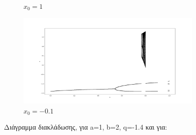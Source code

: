 \begin{figure}[h!]
\begin{subfigure}[b]{0.7\textwidth}
		\caption{\(x_0=1\)}
		\label{f:g21}
	\end{subfigure}
	\hfill
	\begin{subfigure}[b]{0.7\textwidth}
		\centering
		\includegraphics[width=\textwidth]{LateX images/graphs q14/g5}
		\caption{\(x_0=-0.1\)}
		\label{f:g22}
	\end{subfigure}
	\hfill
	\caption{ Διάγραμμα διακλάδωσης, για a=1, b=2, q=-1.4 και για:}
\end{figure}

